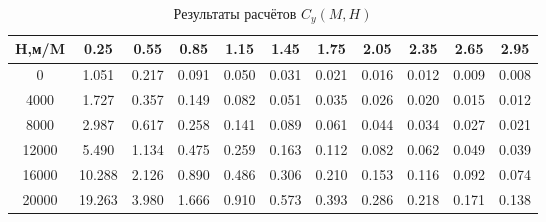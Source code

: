 \begin{table}[H]
\centering
\caption{Результаты расчётов $C_y(M,H)$}
\label{Cy}
\begin{tabular}{|c|c|c|c|c|c|c|c|c|c|c|}
\toprule
H,м/M &    0.25 &   0.55 &   0.85 &   1.15 &   1.45 &   1.75 &   2.05 &   2.35 &   2.65 &   2.95 \\
\midrule
0     &   1.051 &  0.217 &  0.091 &  0.050 &  0.031 &  0.021 &  0.016 &  0.012 &  0.009 &  0.008 \\
4000  &   1.727 &  0.357 &  0.149 &  0.082 &  0.051 &  0.035 &  0.026 &  0.020 &  0.015 &  0.012 \\
8000  &   2.987 &  0.617 &  0.258 &  0.141 &  0.089 &  0.061 &  0.044 &  0.034 &  0.027 &  0.021 \\
12000 &   5.490 &  1.134 &  0.475 &  0.259 &  0.163 &  0.112 &  0.082 &  0.062 &  0.049 &  0.039 \\
16000 &  10.288 &  2.126 &  0.890 &  0.486 &  0.306 &  0.210 &  0.153 &  0.116 &  0.092 &  0.074 \\
20000 &  19.263 &  3.980 &  1.666 &  0.910 &  0.573 &  0.393 &  0.286 &  0.218 &  0.171 &  0.138 \\
\bottomrule
\end{tabular}
\end{table}
